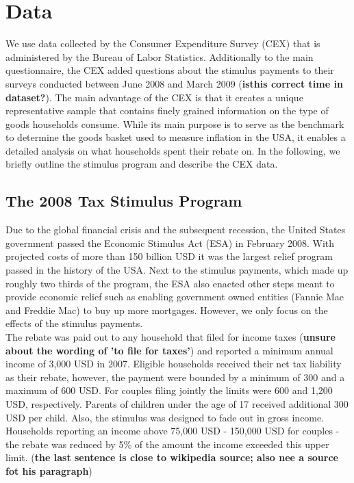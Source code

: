 \newpage
\section{Data} \label{sec:data}
We use data collected by the Consumer Expenditure Survey (CEX) that is administered by the Bureau of Labor Statistics. Additionally to the main questionnaire, the CEX added questions about the stimulus payments to their surveys conducted between June 2008 and March 2009 (\textbf{isthis correct time in dataset?}). The main advantage of the CEX is that it creates a unique representative sample that contains finely grained information on the type of goods households consume. While its main purpose is to serve as the benchmark to determine the goods basket used to measure inflation in the USA, it enables a detailed analysis on what households spent their rebate on. In the following, we briefly outline the stimulus program and describe the CEX data. 

\subsection{The 2008 Tax Stimulus Program} 
Due to the global financial crisis and the subsequent recession, the United States government passed the Economic Stimulus Act (ESA) in February 2008. With projected costs of more than 150 billion USD it was the largest relief program passed in the history of the USA. Next to the stimulus payments, which made up roughly two thirds of the program, the ESA also enacted other steps meant to provide economic relief such as enabling government owned entities (Fannie Mae and Freddie Mac) to buy up more mortgages. However, we only focus on the effects of the stimulus payments. \\
The rebate was paid out to any household that filed for income taxes (\textbf{unsure about the wording of 'to file for taxes'}) and reported a minimum annual income of 3,000 USD in 2007. Eligible households received their net tax liability as their rebate, however, the payment were bounded by a minimum of 300 and a maximum of 600 USD. For couples filing jointly the limits were 600 and 1,200 USD, respectively. Parents of children under the age of 17 received additional 300 USD per child. Also, the stimulus was designed to fade out in gross income. Households reporting an income above 75,000 USD - 150,000 USD for couples -  
the rebate was reduced by 5\% of the amount the income exceeded this upper limit. (\textbf{the last sentence is close to wikipedia source; also nee a source fot his paragraph}) 

